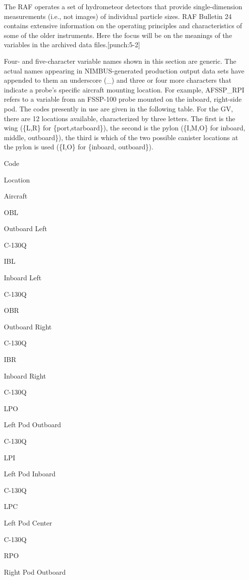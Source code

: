 \documentclass[
  english,
]{book}
\begin{document}
The RAF operates a set of hydrometeor detectors that provide single-dimension measurements (i.e., not images) of individual particle sizes. RAF Bulletin 24 contains extensive information on the operating principles and characteristics of some of the older instruments. Here the focus will be on the meanings of the variables in the archived data files.\protect\hypertarget{punch:5-2}{}{{[}punch:5-2{]}}

\protect\hypertarget{VariableNames1DProbes}{}{}Four- and five-character variable names shown in this section are generic. The actual names appearing in NIMBUS-generated production output data sets have appended to them an underscore (\_) and three or four more characters that indicate a probe's specific aircraft mounting location. For example, AFSSP\_RPI refers to a variable from an FSSP-100 probe mounted on the inboard, right-side pod. The codes presently in use are given in the following table. For the GV, there are 12 locations available, characterized by three letters. The first is the wing (\{L,R\} for \{port,starboard\}), the second is the pylon (\{I,M,O\} for inboard, middle, outboard\}), the third is which of the two possible canister locations at the pylon is used (\{I,O\} for \{inboard, outboard\}).

Code

Location

Aircraft

OBL

Outboard Left

C-130Q

IBL

Inboard Left

C-130Q

OBR

Outboard Right

C-130Q

IBR

Inboard Right

C-130Q

LPO

Left Pod Outboard

C-130Q

LPI

Left Pod Inboard

C-130Q

LPC

Left Pod Center

C-130Q

RPO

Right Pod Outboard
\end{document}
